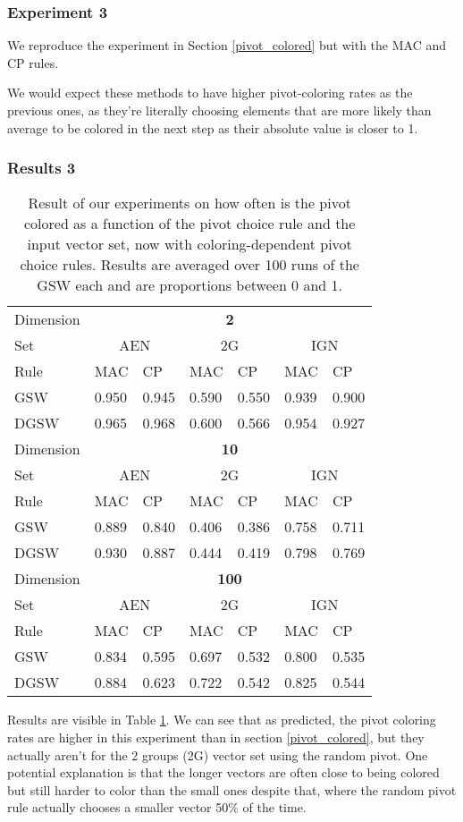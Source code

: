 \documentclass[12pt]{article}
\begin{document}
\subsubsection{Experiment 3}\label{pivot_colored_coloring_rules}
We reproduce the experiment in Section \ref{pivot_colored} but with the MAC and CP rules.

We would expect these methods to have higher pivot-coloring rates as the previous ones, as they're literally choosing elements that are more likely than average to be colored in the next step as their absolute value is closer to 1.
\subsubsection{Results 3}
\begin{center}
\begin{table}[h]
\begin{tabular}{l|ll|ll|ll}
Dimension &\multicolumn{6}{c}{\textbf{2}}\\
Set  & \multicolumn{2}{c}{AEN} & \multicolumn{2}{c}{2G} & \multicolumn{2}{c}{IGN} \\
Rule &MAC&CP&MAC&CP&MAC&CP\\ \hline
GSW  &0.950&0.945&0.590&0.550&0.939&0.900\\
DGSW  &0.965&0.968&0.600&0.566&0.954&0.927\\
\hline
\hline
Dimension &\multicolumn{6}{c}{\textbf{10}}\\
Set  & \multicolumn{2}{c}{AEN} & \multicolumn{2}{c}{2G} & \multicolumn{2}{c}{IGN} \\
Rule &MAC&CP&MAC&CP&MAC&CP\\ \hline
GSW  &0.889&0.840&0.406&0.386&0.758&0.711\\
DGSW  &0.930&0.887&0.444&0.419&0.798&0.769\\
\hline
\hline
Dimension &\multicolumn{6}{c}{\textbf{100}}\\
Set  & \multicolumn{2}{c}{AEN} & \multicolumn{2}{c}{2G} & \multicolumn{2}{c}{IGN} \\
Rule &MAC&CP&MAC&CP&MAC&CP\\ \hline
GSW  &0.834&0.595&0.697&0.532&0.800&0.535\\
DGSW  &0.884&0.623&0.722&0.542&0.825&0.544\\
\end{tabular}
\caption{Result of our experiments on how often is the pivot colored as a function of the pivot choice rule and the input vector set, now with coloring-dependent pivot choice rules. Results are averaged over 100 runs of the GSW each and are proportions between 0 and 1.}
\label{pivot_colored_coloring_rules_results}
\end{table}
\end{center}
Results are visible in Table \ref{pivot_colored_coloring_rules_results}. We can see that as predicted, the pivot coloring rates are higher in this experiment than in section \ref{pivot_colored}, but they actually aren't for the 2 groups (2G) vector set using the random pivot. One potential explanation is that the longer vectors are often close to being colored but still harder to color than the small ones despite that, where the random pivot rule actually chooses a smaller vector 50\% of the time. 
\end{document}
